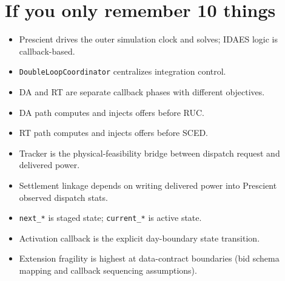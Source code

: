 \documentclass{article}
\begin{document}
\section{If you only remember 10 things}
\begin{itemize}[leftmargin=*]
  \item Prescient drives the outer simulation clock and solves; IDAES logic is callback-based.
  \item \texttt{DoubleLoopCoordinator} centralizes integration control.
  \item DA and RT are separate callback phases with different objectives.
  \item DA path computes and injects offers before RUC.
  \item RT path computes and injects offers before SCED.
  \item Tracker is the physical-feasibility bridge between dispatch request and delivered power.
  \item Settlement linkage depends on writing delivered power into Prescient observed dispatch stats.
  \item \texttt{next\_*} is staged state; \texttt{current\_*} is active state.
  \item Activation callback is the explicit day-boundary state transition.
  \item Extension fragility is highest at data-contract boundaries (bid schema mapping and callback sequencing assumptions).
\end{itemize}
\end{document}

